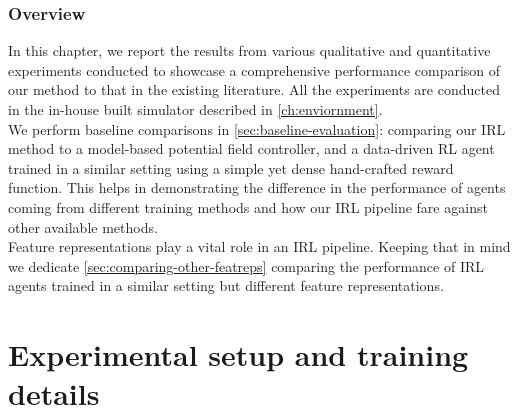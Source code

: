 \subsubsection*{Overview}
In this chapter, we report the results from various qualitative and quantitative experiments conducted to showcase a comprehensive performance comparison of our method to that in the existing literature. All the experiments are conducted in the in-house built simulator described in \autoref{ch:enviornment}. \\
We perform baseline comparisons in \autoref{sec:baseline-evaluation}: comparing our IRL method to a model-based potential field controller, and a data-driven RL agent trained in a similar setting using a simple yet dense hand-crafted reward function. This helps in demonstrating the difference in the performance of agents coming from different training methods and how our IRL pipeline fare against other available methods.\\
 Feature representations play a vital role in an IRL pipeline. Keeping that in mind we dedicate \autoref{sec:comparing-other-featreps} comparing the performance of IRL agents trained in a similar setting but different feature representations.\\

%

\section{Experimental setup and training details}
\label{sec:exp-setup}

